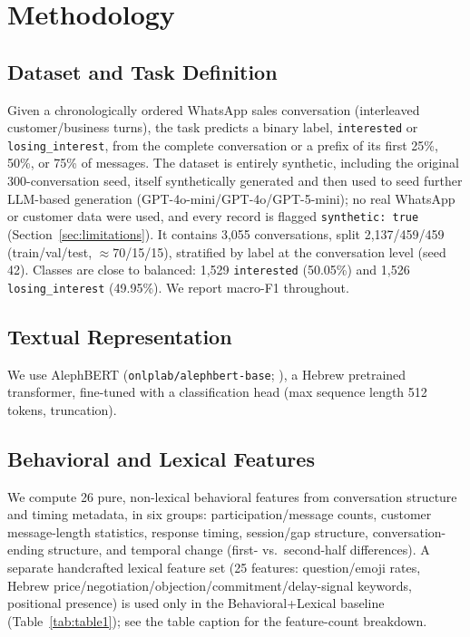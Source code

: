 \documentclass{article}
\begin{document}
\section{Methodology}
\label{sec:methodology}

\subsection{Dataset and Task Definition}
\label{sec:dataset}

Given a chronologically ordered WhatsApp sales conversation (interleaved customer/business turns), the task predicts a binary label, \texttt{interested} or \texttt{losing\_interest}, from the complete conversation or a prefix of its first 25\%, 50\%, or 75\% of messages. The dataset is entirely synthetic, including the original 300-conversation seed, itself synthetically generated and then used to seed further LLM-based generation (GPT-4o-mini/GPT-4o/GPT-5-mini); no real WhatsApp or customer data were used, and every record is flagged \texttt{synthetic: true} (Section~\ref{sec:limitations}). It contains 3,055 conversations, split 2,137/459/459 (train/val/test, $\approx$70/15/15), stratified by label at the conversation level (seed 42). Classes are close to balanced: 1,529 \texttt{interested} (50.05\%) and 1,526 \texttt{losing\_interest} (49.95\%). We report macro-F1 throughout.

\subsection{Textual Representation}
\label{sec:textrep}

We use AlephBERT (\texttt{onlplab/alephbert-base}; \citealp{Seker2022}), a Hebrew pretrained transformer, fine-tuned with a classification head (max sequence length 512 tokens, truncation).

\subsection{Behavioral and Lexical Features}
\label{sec:behavioral}

We compute 26 pure, non-lexical behavioral features from conversation structure and timing metadata, in six groups: participation/message counts, customer message-length statistics, response timing, session/gap structure, conversation-ending structure, and temporal change (first- vs.\ second-half differences). A separate handcrafted lexical feature set (25 features: question/emoji rates, Hebrew price/negotiation/objection/commitment/delay-signal keywords, positional presence) is used only in the Behavioral+Lexical baseline (Table~\ref{tab:table1}); see the table caption for the feature-count breakdown.
\end{document}

